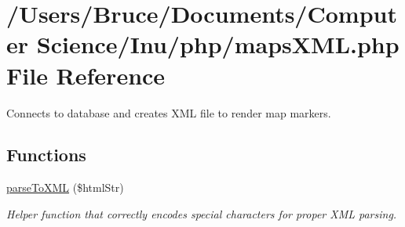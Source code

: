 \hypertarget{maps_x_m_l_8php}{}\section{/\+Users/\+Bruce/\+Documents/\+Computer Science/\+Inu/php/maps\+X\+M\+L.php File Reference}
\label{maps_x_m_l_8php}


Connects to database and creates X\+M\+L file to render map markers.  


\subsection*{Functions}
\begin{DoxyCompactItemize}
\item 
\hyperlink{maps_x_m_l_8php_aa4f830cf26f0fa9084374e6eec2cfc90}{parse\+To\+X\+M\+L} (\$html\+Str)
\begin{DoxyCompactList}\small\item\em Helper function that correctly encodes special characters for proper X\+M\+L parsing. \end{DoxyCompactList}\end{DoxyCompactItemize}
